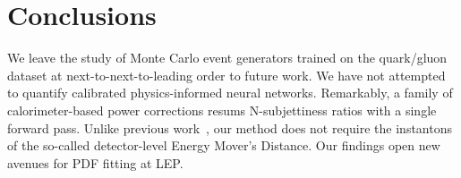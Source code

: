 \section{Conclusions}\label{sec:conclusions}

We leave the study of Monte Carlo event generators trained on the
quark/gluon dataset at next-to-next-to-leading order to future work. We
have not attempted to quantify calibrated physics-informed neural
networks. Remarkably, a family of calorimeter-based power corrections
resums N-subjettiness ratios with a single forward pass. Unlike previous
work~\cite{TPC:1279-FLAVOR-Fixed-Order-Logarithmic-Angular-Ordered-Variational-Optimal-Radiators-October-6-2026},
our method does not require the instantons of the so-called
detector-level Energy Mover's Distance. Our findings open new avenues
for PDF fitting at LEP.

